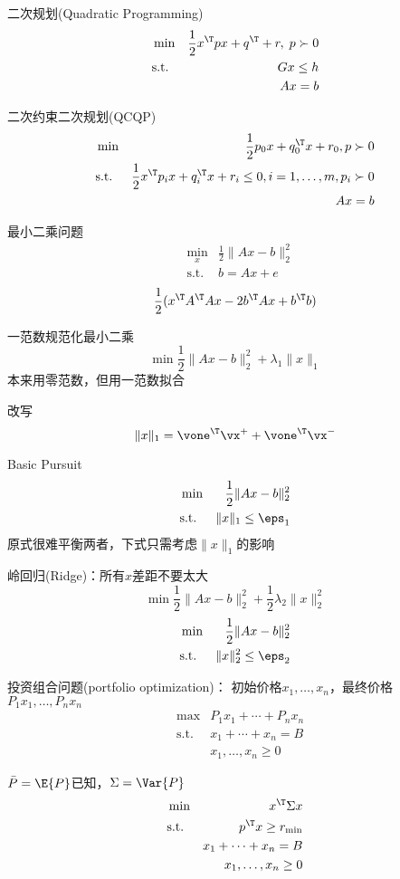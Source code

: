 二次规划(Quadratic Programming)
\[\begin{aligned}
	& \min & \frac{1}{2}x^\T px+q^\T+r,\;p\succ 0\\
	& \text{s.t.} & Gx\leq h\\
	& & Ax=b
\end{aligned}\]

二次约束二次规划(QCQP)
\[\begin{aligned}
	& \min & \frac{1}{2}p_0x+q_0^\T x+r_0,p\succ 0\\
	& \text{s.t.} & \frac{1}{2}x^\T p_ix+q_i^\T x+r_i\leq 0,i=1,\ldots,m,p_i\succ 0\\
	& & Ax=b
\end{aligned}\]

最小二乘问题
\[\begin{aligned}
	& \min_x & \frac{1}{2}\|Ax-b\|_2^2\\
	& \text{s.t.} & b=Ax+e
\end{aligned}\]
\[\frac{1}{2}(x^\T A^\T Ax-2b^\T Ax+b^\T b)\]

一范数规范化最小二乘
\[\min\frac{1}{2}\|Ax-b\|_2^2+\lambda_1\|x\|_1\]
本来用零范数，但用一范数拟合

改写
\[\|x\|_1=\vone^\T\vx^++\vone^\T\vx^-\]

Basic Pursuit
\[\begin{aligned}
	& \min & \frac{1}{2}\|Ax-b\|_2^2\\
	& \text{s.t.} & \|x\|_1\leq\eps_1
\end{aligned}\]
原式很难平衡两者，下式只需考虑$\|x\|_1$的影响

岭回归(Ridge)：所有$x$差距不要太大
\[\min\frac{1}{2}\|Ax-b\|_2^2+\frac{1}{2}\lambda_2\|x\|_2^2\]
\[\begin{aligned}
	& \min & \frac{1}{2}\|Ax-b\|_2^2\\
	& \text{s.t.} & \|x\|_2^2\leq\eps_2
\end{aligned}\]

投资组合问题(portfolio optimization)：
初始价格$x_1,\ldots,x_n$，最终价格$P_1x_1,\ldots,P_nx_n$
\[\begin{aligned}
	& \max & P_1x_1+\cdots+P_nx_n\\
	& \text{s.t.} & x_1+\cdots+x_n=B\\
	& & x_1,\ldots,x_n\geq 0
\end{aligned}\]

$\bar{P}=\E{P}$已知，$\Sigma=\Var{P}$
\[\begin{aligned}
	& \min & x^\T\Sigma x\\
	& \text{s.t.} & p^\T x\geq r_{\min}\\
	& & x_1+\cdots+x_n=B\\
	& & x_1,\ldots,x_n\geq 0
\end{aligned}\]

